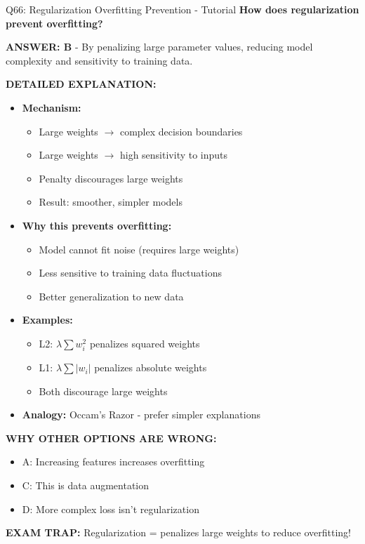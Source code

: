 \documentclass[8pt]{beamer}
\begin{document}
	
	\begin{frame}{Q66: Regularization Overfitting Prevention - Tutorial}
		\fontsize{6.5}{7.5}\selectfont
		\textbf{How does regularization prevent overfitting?}
		
		\vspace{0.05cm}
		\textcolor{myblue}{\textbf{ANSWER: B}} - By penalizing large parameter values, reducing model complexity and sensitivity to training data.
		
		\vspace{0.05cm}
		\textbf{DETAILED EXPLANATION:}
		\begin{itemize}
			\item \textbf{Mechanism:}
			\begin{itemize}
				\item Large weights $\to$ complex decision boundaries
				\item Large weights $\to$ high sensitivity to inputs
				\item Penalty discourages large weights
				\item Result: smoother, simpler models
			\end{itemize}
			\item \textbf{Why this prevents overfitting:}
			\begin{itemize}
				\item Model cannot fit noise (requires large weights)
				\item Less sensitive to training data fluctuations
				\item Better generalization to new data
			\end{itemize}
			\item \textbf{Examples:}
			\begin{itemize}
				\item L2: $\lambda \sum w_i^2$ penalizes squared weights
				\item L1: $\lambda \sum |w_i|$ penalizes absolute weights
				\item Both discourage large weights
			\end{itemize}
			\item \textbf{Analogy:} Occam's Razor - prefer simpler explanations
		\end{itemize}
		
		\vspace{0.05cm}
		\textcolor{myred}{\textbf{WHY OTHER OPTIONS ARE WRONG:}}
		\begin{itemize}
			\item \textcolor{myred}{A:} Increasing features increases overfitting
			\item \textcolor{myred}{C:} This is data augmentation
			\item \textcolor{myred}{D:} More complex loss isn't regularization
		\end{itemize}
		
		\textcolor{myred}{\textbf{EXAM TRAP:}} Regularization = penalizes large weights to reduce overfitting!
	\end{frame}
	
\end{document}
